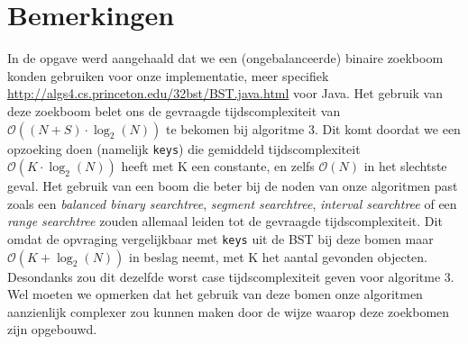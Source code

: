 \documentclass{article}
\begin{document}
\section{Bemerkingen}
In de opgave werd aangehaald dat we een (ongebalanceerde) binaire zoekboom konden gebruiken voor onze implementatie, meer specifiek \url{http://algs4.cs.princeton.edu/32bst/BST.java.html} voor Java. Het gebruik van deze zoekboom belet ons de gevraagde tijdscomplexiteit van $\mathcal{O}((N+S)\cdot\log_2(N))$ te bekomen bij algoritme 3. Dit komt doordat we een opzoeking doen (namelijk \texttt{keys}) die gemiddeld tijdscomplexiteit $\mathcal{O}(K\cdot\log_2(N))$ heeft met K een constante, en zelfs $\mathcal{O}(N)$ in het slechtste geval.
Het gebruik van een boom die beter bij de noden van onze algoritmen past zoals een \textit{balanced binary searchtree}, \textit{segment searchtree}, \textit{interval searchtree} of een \textit{range searchtree} zouden allemaal leiden tot de gevraagde tijdscomplexiteit. Dit omdat de opvraging vergelijkbaar met \texttt{keys} uit de BST bij deze bomen maar $\mathcal{O}(K+\log_2(N))$ in beslag neemt, met K het aantal gevonden objecten. Desondanks zou dit dezelfde worst case tijdscomplexiteit geven voor algoritme 3. Wel moeten we opmerken dat het gebruik van deze bomen onze algoritmen aanzienlijk complexer zou kunnen maken door de wijze waarop deze zoekbomen zijn opgebouwd.
\end{document}
